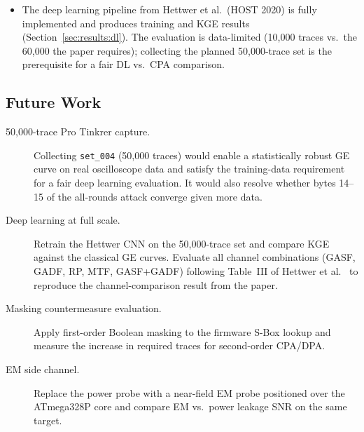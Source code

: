 \begin{itemize}
  \item The deep learning pipeline from Hettwer et al.\ (HOST 2020) is
        fully implemented and produces training and KGE results
        (Section~\ref{sec:results:dl}).
        The evaluation is data-limited (10{,}000 traces vs.\ the 60{,}000
        the paper requires); collecting the planned 50{,}000-trace set is
        the prerequisite for a fair DL vs.\ CPA comparison.
\end{itemize}

\subsection{Future Work}

\begin{description}
  \item[50{,}000-trace Pro Tinkrer capture.]
    Collecting \texttt{set\_004} (50{,}000 traces) would enable a
    statistically robust GE curve on real oscilloscope data and satisfy
    the training-data requirement for a fair deep learning evaluation.
    It would also resolve whether bytes 14--15 of the all-rounds attack
    converge given more data.

  \item[Deep learning at full scale.]
    Retrain the Hettwer CNN on the 50{,}000-trace set and compare KGE
    against the classical GE curves.
    Evaluate all channel combinations (GASF, GADF, RP, MTF, GASF+GADF)
    following Table~III of Hettwer et al.~\cite{hettwer2020encoding} to
    reproduce the channel-comparison result from the paper.

  \item[Masking countermeasure evaluation.]
    Apply first-order Boolean masking to the firmware S-Box lookup and
    measure the increase in required traces for second-order CPA/DPA.

  \item[EM side channel.]
    Replace the power probe with a near-field EM probe positioned over
    the ATmega328P core and compare EM vs.\ power leakage SNR on the
    same target.
\end{description}
